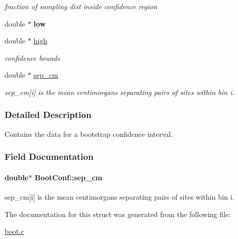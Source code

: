 \begin{DoxyCompactItemize}
\begin{DoxyCompactList}\small\item\em fraction of sampling dist inside confidence region \end{DoxyCompactList}\item 
\hypertarget{struct_boot_conf_aed2ad2c316f488f9d44879571db8cd43}{double $\ast$ {\bfseries low}}\label{struct_boot_conf_aed2ad2c316f488f9d44879571db8cd43}

\item 
\hypertarget{struct_boot_conf_a0daa885809da2a6e7599bced779127d9}{double $\ast$ \hyperlink{struct_boot_conf_a0daa885809da2a6e7599bced779127d9}{high}}\label{struct_boot_conf_a0daa885809da2a6e7599bced779127d9}

\begin{DoxyCompactList}\small\item\em confidence bounds \end{DoxyCompactList}\item 
double $\ast$ \hyperlink{struct_boot_conf_a9c77f42dd63b54e4c46fe697982d63ef}{sep\-\_\-cm}
\begin{DoxyCompactList}\small\item\em sep\-\_\-cm\mbox{[}i\mbox{]} is the mean centimorgans separating pairs of sites within bin i. \end{DoxyCompactList}\end{DoxyCompactItemize}


\subsubsection{Detailed Description}
Contains the data for a bootstrap confidence interval. 



\subsubsection{Field Documentation}
\hypertarget{struct_boot_conf_a9c77f42dd63b54e4c46fe697982d63ef}{
\paragraph[{sep\-\_\-cm}]{\setlength{\rightskip}{0pt plus 5cm}double$\ast$ Boot\-Conf\-::sep\-\_\-cm}}\label{struct_boot_conf_a9c77f42dd63b54e4c46fe697982d63ef}


sep\-\_\-cm\mbox{[}i\mbox{]} is the mean centimorgans separating pairs of sites within bin i. 



The documentation for this struct was generated from the following file\-:\begin{DoxyCompactItemize}
\item 
\hyperlink{boot_8c}{boot.\-c}\end{DoxyCompactItemize}

